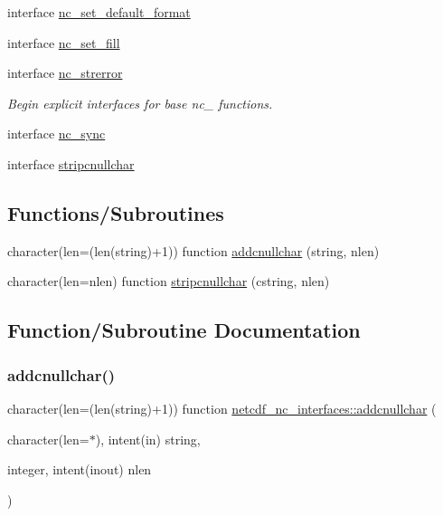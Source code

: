 \begin{DoxyCompactItemize}
interface \hyperlink{interfacenetcdf__nc__interfaces_1_1nc__set__default__format}{nc\+\_\+set\+\_\+default\+\_\+format}
\item 
interface \hyperlink{interfacenetcdf__nc__interfaces_1_1nc__set__fill}{nc\+\_\+set\+\_\+fill}
\item 
interface \hyperlink{interfacenetcdf__nc__interfaces_1_1nc__strerror}{nc\+\_\+strerror}
\begin{DoxyCompactList}\small\item\em Begin explicit interfaces for base nc\+\_\+ functions. \end{DoxyCompactList}\item 
interface \hyperlink{interfacenetcdf__nc__interfaces_1_1nc__sync}{nc\+\_\+sync}
\item 
interface \hyperlink{interfacenetcdf__nc__interfaces_1_1stripcnullchar}{stripcnullchar}
\end{DoxyCompactItemize}
\subsection*{Functions/\+Subroutines}
\begin{DoxyCompactItemize}
\item 
character(len=(len(string)+1)) function \hyperlink{namespacenetcdf__nc__interfaces_ad9d3a194b1b034d3dd647248ad0eed04}{addcnullchar} (string, nlen)
\item 
character(len=nlen) function \hyperlink{namespacenetcdf__nc__interfaces_a2354fd83a30b4ba3b0e9d81003debc5a}{stripcnullchar} (cstring, nlen)
\end{DoxyCompactItemize}


\subsection{Function/\+Subroutine Documentation}
\mbox{\label{namespacenetcdf__nc__interfaces_ad9d3a194b1b034d3dd647248ad0eed04}} 
\subsubsection{\texorpdfstring{addcnullchar()}{addcnullchar()}}
{\footnotesize\ttfamily character(len=(len(string)+1)) function \hyperlink{interfacenetcdf__nc__interfaces_1_1addcnullchar}{netcdf\+\_\+nc\+\_\+interfaces\+::addcnullchar} (\begin{DoxyParamCaption}\item[{character(len=$\ast$), intent(in)}]{string,  }\item[{integer, intent(inout)}]{nlen }\end{DoxyParamCaption})}



